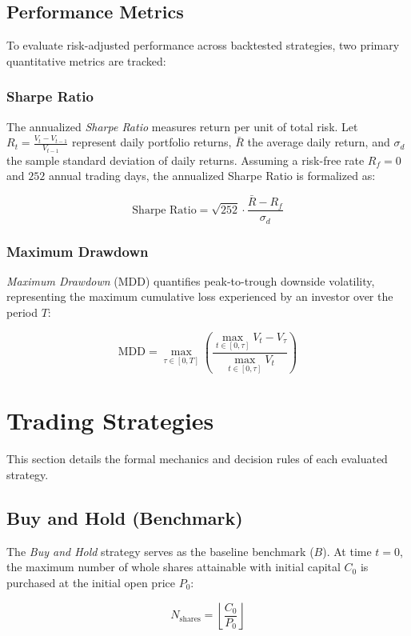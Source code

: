 \documentclass{article}
\begin{document}
\subsection{Performance Metrics}
To evaluate risk-adjusted performance across backtested strategies, two primary quantitative metrics are tracked:

\subsubsection{Sharpe Ratio}
The annualized \textit{Sharpe Ratio} measures return per unit of total risk. Let $R_t = \frac{V_t - V_{t-1}}{V_{t-1}}$ represent daily portfolio returns, $\bar{R}$ the average daily return, and $\sigma_d$ the sample standard deviation of daily returns. Assuming a risk-free rate $R_f = 0$ and $252$ annual trading days, the annualized Sharpe Ratio is formalized as:

\[
\text{Sharpe Ratio} = \sqrt{252} \cdot \frac{\bar{R} - R_f}{\sigma_d}
\]

\subsubsection{Maximum Drawdown}
\textit{Maximum Drawdown} (MDD) quantifies peak-to-trough downside volatility, representing the maximum cumulative loss experienced by an investor over the period $T$:

\[
\text{MDD} = \max_{\tau \in [0, T]} \left( \frac{\max_{t \in [0, \tau]} V_t - V_\tau}{\max_{t \in [0, \tau]} V_t} \right)
\]

\newpage

\section{Trading Strategies}

This section details the formal mechanics and decision rules of each evaluated strategy.

\subsection{Buy and Hold (Benchmark)}
The \textit{Buy and Hold} strategy serves as the baseline benchmark ($B$). At time $t = 0$, the maximum number of whole shares attainable with initial capital $C_0$ is purchased at the initial open price $P_0$:

\[
N_{\text{shares}} = \left\lfloor\frac{C_0}{P_0}\right\rfloor
\]
\end{document}
